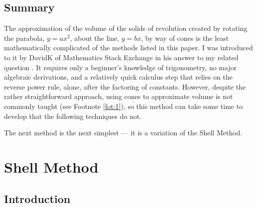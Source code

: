 \documentclass{article}
\begin{document}
\subsection{Summary}
The approximation of the volume of the solids of revolution created by rotating the parabola, $y=ax^2$, about the line, $y=bx$, by way of cones is the least mathematically complicated of the methods listed in this paper. I was introduced to it by DavidK of Mathematics Stack Exchange in his answer \cite{BIB:cone} to my related question \cite{BIB:disk2}. It requires only a beginner's knowledge of trigonometry, no major algebraic derivations, and a relatively quick calculus step that relies on the reverse power rule, alone, after the factoring of constants. However, despite the rather straightforward approach, using cones to approximate volume is not commonly taught (see Footnote \ref{fot:1}), so this method can take some time to develop that the following techniques do not.\par
The next method is the next simplest --- it is a variation of the Shell Method.
\newpage

\section{Shell Method}
\subsection{Introduction}
\end{document}
